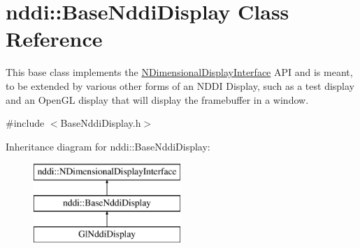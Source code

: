 \hypertarget{classnddi_1_1_base_nddi_display}{
\section{nddi::BaseNddiDisplay Class Reference}
\label{classnddi_1_1_base_nddi_display}
}


This base class implements the \hyperlink{classnddi_1_1_n_dimensional_display_interface}{NDimensionalDisplayInterface} API and is meant, to be extended by various other forms of an NDDI Display, such as a test display and an OpenGL display that will display the framebuffer in a window.  




{\ttfamily \#include $<$BaseNddiDisplay.h$>$}

Inheritance diagram for nddi::BaseNddiDisplay:\begin{figure}[H]
\begin{center}
\leavevmode
\includegraphics[height=3.000000cm]{classnddi_1_1_base_nddi_display}
\end{center}
\end{figure}

